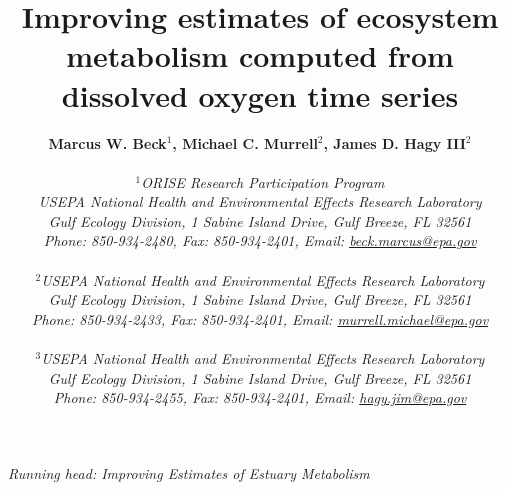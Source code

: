 \begin{singlespace}
\title{{\bf {\Large Improving estimates of ecosystem metabolism computed from dissolved oxygen time series}}}
\author{
  {\bf {\normalsize Marcus W. Beck$^1$, Michael C. Murrell$^2$, James D. Hagy III$^2$}}
  \\\\{\textit {\normalsize $^1$ORISE Research Participation Program}}
  \\{\textit {\normalsize USEPA National Health and Environmental Effects Research Laboratory}}
	\\{\textit {\normalsize Gulf Ecology Division, 1 Sabine Island Drive, Gulf Breeze, FL 32561}}
	\\{\textit {\normalsize Phone: 850-934-2480, Fax: 850-934-2401, Email: \href{mailto:beck.marcus@epa.gov}{beck.marcus@epa.gov}}}
  \\\\{\textit {\normalsize $^2$USEPA National Health and Environmental Effects Research Laboratory}}
	\\{\textit {\normalsize Gulf Ecology Division, 1 Sabine Island Drive, Gulf Breeze, FL 32561}}
	\\{\textit {\normalsize Phone: 850-934-2433, Fax: 850-934-2401, Email: \href{mailto:murrell.michael@epa.gov}{murrell.michael@epa.gov}}}
  \\\\{\textit {\normalsize $^3$USEPA National Health and Environmental Effects Research Laboratory}}
	\\{\textit {\normalsize Gulf Ecology Division, 1 Sabine Island Drive, Gulf Breeze, FL 32561}}
	\\{\textit {\normalsize Phone: 850-934-2455, Fax: 850-934-2401, Email: \href{mailto:hagy.jim@epa.gov}{hagy.jim@epa.gov}}}
	}
\date{}
\maketitle
\vfill{\centerline{\textit {\normalsize Running head: Improving Estimates of Estuary Metabolism}}}
\end{singlespace}
\clearpage